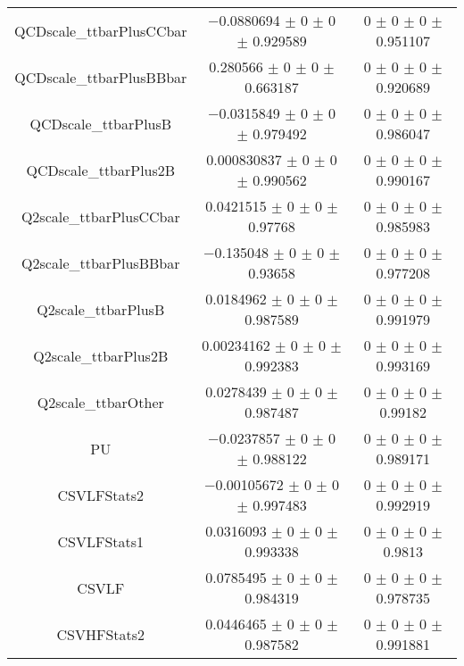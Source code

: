 \begin{table}
\begin{tabular}{ccc}
QCDscale\_ttbarPlusCCbar & \num{-0.0880694} $\pm$ \num{0} $\pm$ \num{0} $\pm$ \num{0.929589} & \num{0} $\pm$ \num{0} $\pm$ \num{0} $\pm$ \num{0.951107}\\
QCDscale\_ttbarPlusBBbar & \num{0.280566} $\pm$ \num{0} $\pm$ \num{0} $\pm$ \num{0.663187} & \num{0} $\pm$ \num{0} $\pm$ \num{0} $\pm$ \num{0.920689}\\
QCDscale\_ttbarPlusB & \num{-0.0315849} $\pm$ \num{0} $\pm$ \num{0} $\pm$ \num{0.979492} & \num{0} $\pm$ \num{0} $\pm$ \num{0} $\pm$ \num{0.986047}\\
QCDscale\_ttbarPlus2B & \num{0.000830837} $\pm$ \num{0} $\pm$ \num{0} $\pm$ \num{0.990562} & \num{0} $\pm$ \num{0} $\pm$ \num{0} $\pm$ \num{0.990167}\\
Q2scale\_ttbarPlusCCbar & \num{0.0421515} $\pm$ \num{0} $\pm$ \num{0} $\pm$ \num{0.97768} & \num{0} $\pm$ \num{0} $\pm$ \num{0} $\pm$ \num{0.985983}\\
Q2scale\_ttbarPlusBBbar & \num{-0.135048} $\pm$ \num{0} $\pm$ \num{0} $\pm$ \num{0.93658} & \num{0} $\pm$ \num{0} $\pm$ \num{0} $\pm$ \num{0.977208}\\
Q2scale\_ttbarPlusB & \num{0.0184962} $\pm$ \num{0} $\pm$ \num{0} $\pm$ \num{0.987589} & \num{0} $\pm$ \num{0} $\pm$ \num{0} $\pm$ \num{0.991979}\\
Q2scale\_ttbarPlus2B & \num{0.00234162} $\pm$ \num{0} $\pm$ \num{0} $\pm$ \num{0.992383} & \num{0} $\pm$ \num{0} $\pm$ \num{0} $\pm$ \num{0.993169}\\
Q2scale\_ttbarOther & \num{0.0278439} $\pm$ \num{0} $\pm$ \num{0} $\pm$ \num{0.987487} & \num{0} $\pm$ \num{0} $\pm$ \num{0} $\pm$ \num{0.99182}\\
PU & \num{-0.0237857} $\pm$ \num{0} $\pm$ \num{0} $\pm$ \num{0.988122} & \num{0} $\pm$ \num{0} $\pm$ \num{0} $\pm$ \num{0.989171}\\
CSVLFStats2 & \num{-0.00105672} $\pm$ \num{0} $\pm$ \num{0} $\pm$ \num{0.997483} & \num{0} $\pm$ \num{0} $\pm$ \num{0} $\pm$ \num{0.992919}\\
CSVLFStats1 & \num{0.0316093} $\pm$ \num{0} $\pm$ \num{0} $\pm$ \num{0.993338} & \num{0} $\pm$ \num{0} $\pm$ \num{0} $\pm$ \num{0.9813}\\
CSVLF & \num{0.0785495} $\pm$ \num{0} $\pm$ \num{0} $\pm$ \num{0.984319} & \num{0} $\pm$ \num{0} $\pm$ \num{0} $\pm$ \num{0.978735}\\
CSVHFStats2 & \num{0.0446465} $\pm$ \num{0} $\pm$ \num{0} $\pm$ \num{0.987582} & \num{0} $\pm$ \num{0} $\pm$ \num{0} $\pm$ \num{0.991881}\\

\end{tabular}
\end{table}
